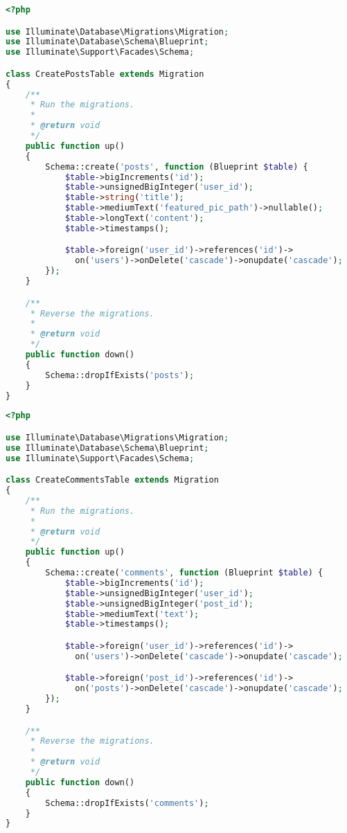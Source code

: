 \documentclass[11pt, oneside]{article}   	%
\begin{document}
\begin{lstlisting}[showstringspaces=false, title=CreatePostsTable.java, language=PHP, frame=single]
<?php

use Illuminate\Database\Migrations\Migration;
use Illuminate\Database\Schema\Blueprint;
use Illuminate\Support\Facades\Schema;

class CreatePostsTable extends Migration
{
    /**
     * Run the migrations.
     *
     * @return void
     */
    public function up()
    {
        Schema::create('posts', function (Blueprint $table) {
            $table->bigIncrements('id');
            $table->unsignedBigInteger('user_id');
            $table->string('title');
            $table->mediumText('featured_pic_path')->nullable();
            $table->longText('content');
            $table->timestamps();

            $table->foreign('user_id')->references('id')->
              on('users')->onDelete('cascade')->onupdate('cascade');
        });
    }

    /**
     * Reverse the migrations.
     *
     * @return void
     */
    public function down()
    {
        Schema::dropIfExists('posts');
    }
}
\end{lstlisting}

\begin{lstlisting}[showstringspaces=false, title=CreateCommentsTable.java, language=PHP, frame=single]
<?php

use Illuminate\Database\Migrations\Migration;
use Illuminate\Database\Schema\Blueprint;
use Illuminate\Support\Facades\Schema;

class CreateCommentsTable extends Migration
{
    /**
     * Run the migrations.
     *
     * @return void
     */
    public function up()
    {
        Schema::create('comments', function (Blueprint $table) {
            $table->bigIncrements('id');
            $table->unsignedBigInteger('user_id');
            $table->unsignedBigInteger('post_id');
            $table->mediumText('text');
            $table->timestamps();

            $table->foreign('user_id')->references('id')->
              on('users')->onDelete('cascade')->onupdate('cascade');

            $table->foreign('post_id')->references('id')->
              on('posts')->onDelete('cascade')->onupdate('cascade');
        });
    }

    /**
     * Reverse the migrations.
     *
     * @return void
     */
    public function down()
    {
        Schema::dropIfExists('comments');
    }
}
\end{lstlisting}
\end{document}
